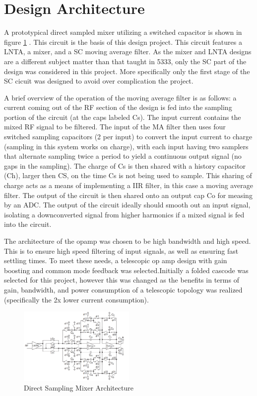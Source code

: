 \documentclass[conference]{IEEEtran}
\begin{document}
\section{Design Architecture}
A prototypical direct sampled mixer utilizing a switched capacitor is shown in figure \ref{a} \cite{IEEEhowto:ninh}. This circuit is the basis of this design project. This circuit features a LNTA, a mixer, and a SC moving average filter. As the mixer and LNTA designs are a different subject matter than that taught in 5333, only the SC part of the design was considered in this project. More specifically only the first stage of the SC cicuit was designed to avoid over complication the project.\par
A brief overview of the operation of the moving average filter is as follows: a current coming out of the RF section of the design is fed into the sampling portion of the circuit (at the caps labeled Cs). The input current contains the mixed RF signal to be filtered. The input of the MA filter then uses four switched sampling capacitors (2 per input) to convert the input current to charge (sampling in this system works on charge), with each input having two samplers that alternate sampling twice a period to yield a continuous output signal (no gaps in the sampling). The charge of Cs is then shared with a history capacitor (Ch), larger then CS, on the time Cs is not being used to sample. This sharing of charge acts as a means of implementing a IIR filter, in this case a moving average filter. The output of the circuit is then shared onto an output cap Co for measing by an ADC. The output of the circuit ideally should smooth out an input signal, isolating a downconverted signal from higher harmonics if a mixed signal is fed into the circuit.\par
The architecture of the opamp was chosen to be high bandwidth and high speed. This is to ensure high speed filtering of input signals, as well as ensuring fast settling times. To meet these needs, a telescopic op amp design with gain boosting and common mode feedback was selected.Initially a folded cascode was selected for this project, however this was changed as the benefits in terms of gain, bandwidth, and power consumption of a telescopic topology was realized (specifically the 2x lower current consumption).
\begin{figure}
\includegraphics[width=0.5\textwidth]{cir.png}
\caption{Direct Sampling Mixer Architecture \cite{IEEEhowto:ninh}}
\label{a}
\end{figure}
\end{document}
